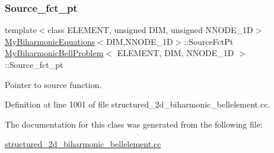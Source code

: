\subsubsection{\texorpdfstring{Source\+\_\+fct\+\_\+pt}{Source\_fct\_pt}}
{\footnotesize\ttfamily template$<$class E\+L\+E\+M\+E\+NT, unsigned D\+IM, unsigned N\+N\+O\+D\+E\+\_\+1D$>$ \\
\hyperlink{classoomph_1_1MyBiharmonicEquations}{My\+Biharmonic\+Equations}$<$D\+IM,N\+N\+O\+D\+E\+\_\+1D$>$\+::Source\+Fct\+Pt \hyperlink{classMyBiharmonicBellProblem}{My\+Biharmonic\+Bell\+Problem}$<$ E\+L\+E\+M\+E\+NT, D\+IM, N\+N\+O\+D\+E\+\_\+1D $>$\+::Source\+\_\+fct\+\_\+pt\hspace{0.3cm}{\ttfamily [private]}}



Pointer to source function. 



Definition at line 1001 of file structured\+\_\+2d\+\_\+biharmonic\+\_\+bellelement.\+cc.



The documentation for this class was generated from the following file\+:\begin{DoxyCompactItemize}
\item 
\hyperlink{structured__2d__biharmonic__bellelement_8cc}{structured\+\_\+2d\+\_\+biharmonic\+\_\+bellelement.\+cc}\end{DoxyCompactItemize}
